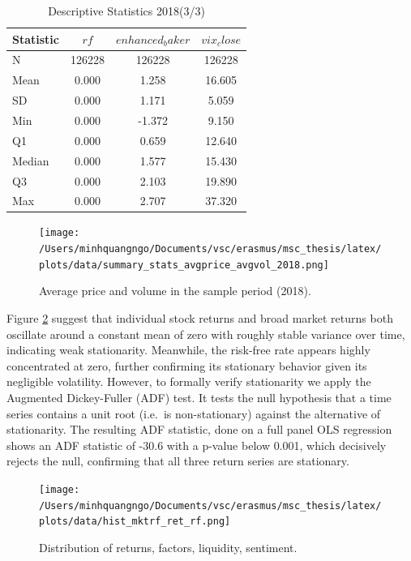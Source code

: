    \begin{table}[ht]
    \centering
    \caption{Descriptive Statistics 2018(3/3)}
    \label{tab:descr_stats_2018_3}
    \begin{tabular}{lccc}
    \toprule
    Statistic & $rf$ & $enhanced_baker$ & $vix_close$ \\\midrule
    N & 126228 & 126228 & 126228 \\
    Mean & 0.000 & 1.258 & 16.605 \\
    SD & 0.000 & 1.171 & 5.059 \\
    Min & 0.000 & -1.372 & 9.150 \\
    Q1 & 0.000 & 0.659 & 12.640 \\
    Median & 0.000 & 1.577 & 15.430 \\
    Q3 & 0.000 & 2.103 & 19.890 \\
    Max & 0.000 & 2.707 & 37.320 \\
    \bottomrule
    \end{tabular}
    \end{table}
 
    \begin{figure}[H]
        \centering
        \texttt{[image: /Users/minhquangngo/Documents/vsc/erasmus/msc\_thesis/latex/plots/data/summary\_stats\_avgprice\_avgvol\_2018.png]}
        \caption{Average price and volume in the sample period (2018).}
        \label{fig:avgprice_avgvol_2018}
    \end{figure}

 Figure \ref{fig:his_mktrf_ret_rf} suggest that individual stock returns and broad market returns both oscillate around a constant mean of zero with roughly stable variance over time, indicating weak stationarity. Meanwhile, the risk-free rate appears highly concentrated at zero, further confirming its stationary behavior given its negligible volatility. However, to formally verify stationarity we apply the Augmented Dickey-Fuller (ADF) test. It tests the null hypothesis that a time series contains a unit root (i.e.\ is non-stationary) against the alternative of stationarity. The resulting ADF statistic, done on a full panel OLS regression shows an ADF statistic of -30.6 with a p-value below 0.001, which decisively rejects the null, confirming that all three return series are stationary.


\begin{figure}[H]
     \centering
     \texttt{[image: /Users/minhquangngo/Documents/vsc/erasmus/msc\_thesis/latex/plots/data/hist\_mktrf\_ret\_rf.png]}
     \caption{Distribution of returns, factors, liquidity, sentiment.}
     \label{fig:his_mktrf_ret_rf}
 \end{figure}

